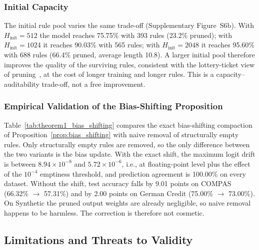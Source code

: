 

\subsubsection{Initial Capacity}
The initial rule pool varies the same trade-off (Supplementary Figure~S6b). With
$H_{\text{init}} = 512$ the model reaches 75.75\% with 393 rules (23.2\% pruned);
with $H_{\text{init}} = 1024$ it reaches 90.03\% with 565 rules; with
$H_{\text{init}} = 2048$ it reaches 95.60\% with 688 rules (66.4\% pruned, average
length 10.8). A larger initial pool therefore improves the quality of the
surviving rules, consistent with the lottery-ticket view of
pruning~\cite{frankle2018lottery}, at the cost of longer training and longer
rules. This is a capacity--auditability trade-off, not a free improvement.

\subsubsection{Empirical Validation of the Bias-Shifting Proposition}
Table~\ref{tab:theorem1_bias_shifting} compares the exact bias-shifting
compaction of Proposition~\ref{prop:bias_shifting} with naive removal of
structurally empty rules. Only structurally empty rules are removed, so the only
difference between the two variants is the bias update. With the exact shift, the
maximum logit drift is between $8.94 \times 10^{-8}$ and $5.72 \times 10^{-6}$,
i.e., at floating-point level plus the effect of the $10^{-4}$ emptiness
threshold, and prediction agreement is 100.00\% on every dataset. Without the
shift, test accuracy falls by 9.01 points on COMPAS (66.32\% $\to$ 57.31\%) and by
2.00 points on German Credit (75.00\% $\to$ 73.00\%). On Synthetic the pruned
output weights are already negligible, so naive removal happens to be harmless.
The correction is therefore not cosmetic.



\subsection{Limitations and Threats to Validity}
\label{subsec:limitations}

